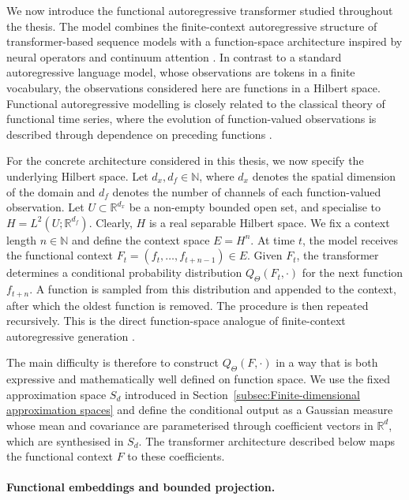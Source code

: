 We now introduce the functional autoregressive transformer studied throughout the thesis. The model combines the finite-context autoregressive structure of transformer-based sequence models with a function-space architecture inspired by neural operators and continuum attention \cite{VaswaniEtAl2017,KovachkiEtAl2023,CalvelloEtAl2025}. In contrast to a standard autoregressive language model, whose observations are tokens in a finite vocabulary, the observations considered here are functions in a Hilbert space. Functional autoregressive modelling is closely related to the classical theory of functional time series, where the evolution of function-valued observations is described through dependence on preceding functions \cite{Bosq2000,HormannKokoszka2010,AueEtAl2015}.

For the concrete architecture considered in this thesis, we now specify the underlying Hilbert space. Let \(d_x,d_f\in\mathbb N\), where \(d_x\) denotes the spatial dimension of the domain and \(d_f\) denotes the number of channels of each function-valued observation. Let \(U\subset\mathbb R^{d_x}\) be a non-empty bounded open set, and specialise to
\(
H=L^2(U;\mathbb R^{d_f}).
\) Clearly, \(H\) is a real separable Hilbert space.
We fix a context length \(n\in\mathbb N\) and define the context space
\(
E=H^n.
\) At time \(t\), the model receives the functional context
\(
F_t=(f_t,\ldots,f_{t+n-1})\in E.
\)
Given \(F_t\), the transformer determines a conditional probability distribution \(Q_\Theta(F_t,\cdot)\) for the next function \(f_{t+n}\). A function is sampled from this distribution and appended to the context, after which the oldest function is removed. The procedure is then repeated recursively. This is the direct function-space analogue of finite-context autoregressive generation \cite{BrownEtAl2020,ZekriEtAl2025}.

The main difficulty is therefore to construct \(Q_\Theta(F,\cdot)\) in a way that is both expressive and mathematically well defined on function space. We use the fixed approximation space \(S_d\) introduced in Section~\ref{subsec:Finite-dimensional approximation spaces} and define the conditional output as a Gaussian measure whose mean and covariance are parameterised through coefficient vectors in \(\mathbb R^d\), which are synthesised in \(S_d\). The transformer architecture described below maps the functional context \(F\) to these coefficients.

\paragraph{Functional embeddings and bounded projection.}

